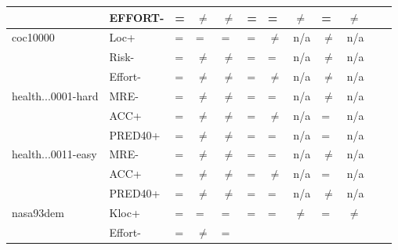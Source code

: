 \begin{tabular}{llllllllllll}
            & EFFORT- & = & $\neq$ & $\neq$ & 
                        = & = & $\neq$ & 
                        = & $\neq$ & 
                        \\
  \hline
  coc10000   & Loc+   & = & = & = &
                        = & $\neq$ & n/a & 
                        $\neq$ & n/a & 
                        \\
             & Risk-  & = & $\neq$ & $\neq$ &
                        = & =  & n/a & 
                        $\neq$ & n/a & 
                         \\
             & Effort- &  = & $\neq$ & $\neq$ &
                          = & $\neq$ & n/a & 
                          $\neq$ & n/a & 
                           \\
  \hline
  health...0001-hard     & MRE-       & = & $\neq$ & $\neq$ & 
                                        = & = & n/a & 
                                        $\neq$ & n/a & 
                                        \\
                         & ACC+       & = & $\neq$ & $\neq$ & 
                                        = & $\neq$ & n/a & 
                                        = & n/a & 
                                        \\
                         & PRED40+    & = & $\neq$ & $\neq$ & 
                                        = & = & n/a & 
                                        = & n/a & 
                                        \\
  \hline
  health...0011-easy     & MRE-       & = & $\neq$ & $\neq$ & 
                                        = & = & n/a & 
                                        $\neq$ & n/a & 
                                        \\
                         & ACC+       & = & $\neq$ & $\neq$ & 
                                        = & $\neq$ & n/a & 
                                        = & n/a & 
                                        \\
                         & PRED40+    & = & $\neq$ & $\neq$ & 
                                        = & = & n/a & 
                                        $\neq$ & n/a & 
                                         \\
  \hline
  nasa93dem   & Kloc+         & = & = & = & 
                                = & = & $\neq$ & 
                                = & $\neq$ & 
                                \\
              & Effort-       & = & $\neq$ & = & 

\end{tabular}

